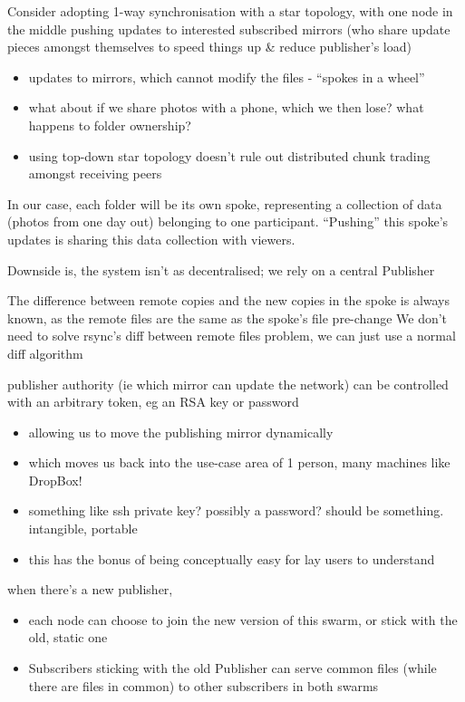 \documentclass[12pt,a4paper,]{adreport}
\begin{document}
Consider adopting 1-way synchronisation with a star topology, with one
node in the middle pushing updates to interested subscribed mirrors (who
share update pieces amongst themselves to speed things up \& reduce
publisher's load)

\begin{itemize}
\itemsep1pt\parskip0pt
\item
  updates to mirrors, which cannot modify the files - ``spokes in a
  wheel''
\item
  what about if we share photos with a phone, which we then lose? what
  happens to folder ownership?
\item
  using top-down star topology doesn't rule out distributed chunk
  trading amongst receiving peers
\end{itemize}

In our case, each folder will be its own spoke, representing a
collection of data (photos from one day out) belonging to one
participant. ``Pushing'' this spoke's updates is sharing this data
collection with viewers.

Downside is, the system isn't as decentralised; we rely on a central
Publisher

The difference between remote copies and the new copies in the spoke is
always known, as the remote files are the same as the spoke's file
pre-change We don't need to solve rsync's diff between remote files
problem, we can just use a normal diff algorithm

publisher authority (ie which mirror can update the network) can be
controlled with an arbitrary token, eg an RSA key or password

\begin{itemize}
\itemsep1pt\parskip0pt
\item
  allowing us to move the publishing mirror dynamically
\item
  which moves us back into the use-case area of 1 person, many machines
  like DropBox!
\item
  something like ssh private key? possibly a password? should be
  something. intangible, portable
\item
  this has the bonus of being conceptually easy for lay users to
  understand
\end{itemize}

when there's a new publisher,

\begin{itemize}
\itemsep1pt\parskip0pt
\item
  each node can choose to join the new version of this swarm, or stick
  with the old, static one
\item
  Subscribers sticking with the old Publisher can serve common files
  (while there are files in common) to other subscribers in both swarms
\end{itemize}
\end{document}
